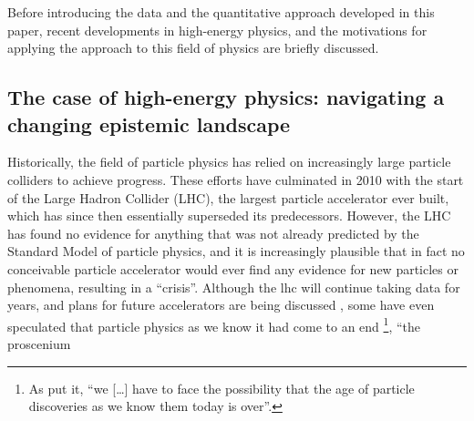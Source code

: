 \documentclass{article}
\begin{document}
Before introducing the data and the quantitative approach developed in this paper, recent developments in high-energy physics, and the motivations for applying the approach to this field of physics are briefly discussed. 




\subsection{\label{sec:hep}The case of high-energy physics: navigating a changing epistemic landscape}

Historically, the field of particle physics has relied on increasingly large particle colliders to achieve progress. These efforts have culminated in 2010 with the start of the Large Hadron Collider (LHC), the largest particle accelerator ever built, which has since then essentially superseded its predecessors. However, the LHC has found no evidence for anything that was not already predicted by the Standard Model of particle physics, and it is increasingly plausible that in fact no conceivable particle accelerator would ever find any evidence for new particles or phenomena, resulting in a ``crisis''\citep{susy_crisis}. Although the \gls{lhc} will continue taking data for years, and plans for future accelerators are being discussed \citep{Roser2023}, some have even speculated that particle physics as we know it had come to an end \citep{Harlander2023,Kosyakov2023}\footnote{As \citet{Harlander2023} put it, ``we [\dots] have to face the possibility that the age of particle discoveries as we know them today is over''.}, ``the proscenium
\end{document}
